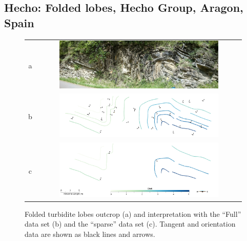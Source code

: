 \documentclass[final]{ring20}
\begin{document}

\subsection{Hecho: Folded lobes, Hecho Group, Aragon, Spain}
\label{sec:Hecho}

\begin{figure}
\centering\begin{tabular}{cc}
a & \includegraphics[width=0.8\textwidth]{Hecho1}\\
b & \includegraphics[width=0.8\textwidth]{Hecho2} \\
c & \includegraphics[width=0.8\textwidth]{Hecho3} \\
\end{tabular}
\caption{Folded turbidite lobes outcrop (a) and interpretation with the ``Full'' data set (b) and the ``sparse'' data set (c). 
Tangent and orientation data are shown as black lines and arrows.}
\label{fig:FLH2D}
\end{figure}
\end{document}

